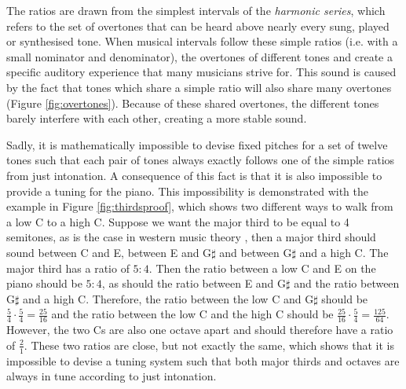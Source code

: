 \documentclass[a4paper]{article}
\begin{document}
The ratios are drawn from the simplest intervals of the \textit{harmonic series}, which refers to the set of overtones that can be heard above nearly every sung, played or synthesised tone. When musical intervals follow these simple ratios (i.e. with a small nominator and denominator), the overtones of different tones  and create a specific auditory experience that many musicians strive for. This sound is caused by the fact that tones which share a simple ratio will also share many overtones (Figure \ref{fig:overtones}). Because of these shared overtones, the different tones barely interfere with each other, creating a more stable sound.

Sadly, it is mathematically impossible to devise fixed pitches for a set of twelve tones such that each pair of tones always exactly follows one of the simple ratios from just intonation. A consequence of this fact is that it is also impossible to provide a  tuning for the piano. This impossibility is demonstrated with the example in Figure \ref{fig:thirdsproof}, which shows two different ways to walk from a low C to a high C. Suppose we want the major third to be equal to 4 semitones, as is the case in western music theory \cite{forte_tonal_1979}, then a major third should sound between C and E, between E and G$\sharp$ and between G$\sharp$ and a high C. The major third has a ratio of $5:4$. Then the ratio between a low C and E on the piano should be $5:4$, as should the ratio between E and G$\sharp$ and the ratio between G$\sharp$ and a high C. Therefore, the ratio between the low C and G$\sharp$ should be $\frac54 \cdot \frac54 = \frac{25}{16}$ and the ratio between the low C and the high C should be $\frac{25}{16} \cdot \frac54 = \frac{125}{64}$. However, the two Cs are also one octave apart and should therefore have a ratio of $\frac21$. These two ratios are close, but not exactly the same, which shows that it is impossible to devise a tuning system such that both major thirds and octaves are always in tune according to just intonation.
\end{document}
